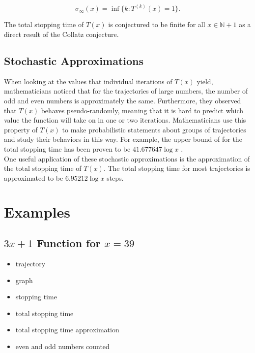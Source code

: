 \documentclass[12pt,a4paper,reqno]{amsart}
\begin{document}
\begin{equation}
    \nonumber
    \sigma_{\infty}(x)=\inf\{k:T^{(k)}(x)=1\}.
\end{equation}

The total stopping time of $T(x)$ is conjectured to be finite for all $x \in
\mathbb{N} + 1$ as a direct result of the Collatz conjecture.

\subsection{Stochastic Approximations}

When looking at the values that individual iterations of $T(x)$ yield,
mathematicians noticed that for the trajectories of large numbers, the number
of odd and even numbers is approximately the same.
Furthermore, they observed
that $T(x)$ behaves pseudo-randomly, meaning that it is hard to predict which
value the function will take on in one or two iterations. Mathematicians use
this property of $T(x)$ to make probabilistic statements about groups of
trajectories and study their behaviors in this way. For example, the upper
bound of for the total stopping time has been proven to be $41.677647 \log x$
\cite{src:03}. \\
One useful application of these stochastic approximations is the approximation
of the total stopping time of $T(x)$. The total stopping time for most 
trajectories is approximated to be $6.95212 \log x$ steps. 

\section{Examples}

\subsection{$3x+1$ Function for $x=39$}

\begin{itemize}
    \item trajectory
    \item graph
    \item stopping time
    \item total stopping time
    \item total stopping time approximation
    \item even and odd numbers counted
\end{itemize}
\end{document}
